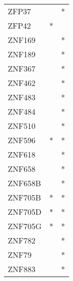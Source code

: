 \begin{longtable}{lcc}
ZFP37                 &                &          * \\
ZFP42                 &              * &            \\
ZNF169                &                &          * \\
ZNF189                &                &          * \\
ZNF367                &                &          * \\
ZNF462                &                &          * \\
ZNF483                &                &          * \\
ZNF484                &                &          * \\
ZNF510                &                &          * \\
ZNF596                &              * &          * \\
ZNF618                &                &          * \\
ZNF658                &                &          * \\
ZNF658B               &                &          * \\
ZNF705B               &              * &          * \\
ZNF705D               &              * &          * \\
ZNF705G               &              * &          * \\
ZNF782                &                &          * \\
ZNF79                 &                &          * \\
ZNF883                &                &          * \\
\end{longtable}
